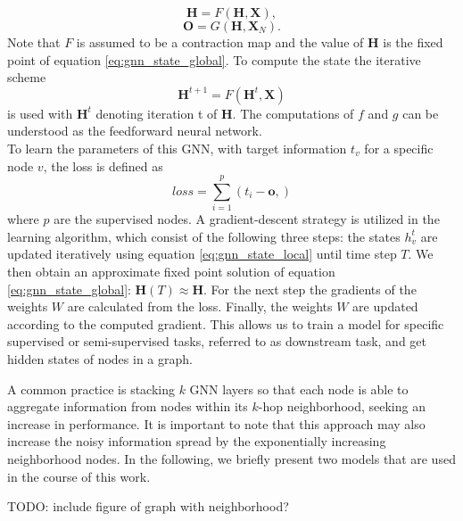 \begin{equation}
    \mathbf{H} = F(\mathbf{H}, \mathbf{X}),
    \label{eq:gnn_state_global}
\end{equation}
\begin{equation}
    \mathbf{O} = G(\mathbf{H},\mathbf{X}_N).
\end{equation}
Note that $F$ is assumed to be a contraction map and the value of $\mathbf{H}$ is the fixed point of equation \eqref{eq:gnn_state_global}. To compute the state the iterative scheme
\begin{equation}
    \label{eq:GNN_iterations}
    \mathbf{H}^{t+1} = F(\mathbf{H}^t, \mathbf{X})
\end{equation}
is used with $\mathbf{H}^t$ denoting iteration t of $\mathbf{H}$. The computations of $f$ and $g$ can be understood as the feedforward neural network. \\
To learn the parameters of this GNN, with target information $t_v$ for a specific node $v$, the loss is defined as
\begin{equation}
    loss = \sum_{i=1}^p (t_i-\mathbf{o},)
\end{equation}
where $p$ are the supervised nodes. A gradient-descent strategy is utilized in the learning algorithm, which consist of the following three steps: the states $h_v^t$ are updated iteratively using equation \eqref{eq:gnn_state_local} until time step $T$. We then obtain an approximate fixed point solution of equation \eqref{eq:gnn_state_global}: $\mathbf{H}(T)\approx\mathbf{H}$. For the next step the gradients of the weights $W$ are calculated from the loss. Finally, the weights $W$ are updated according to the computed gradient. This allows us to train a model for specific supervised or semi-supervised tasks, referred to as downstream task, and get hidden states of nodes in a graph. \bigskip

A common practice is stacking $k$ GNN layers so that each node is able to aggregate information from nodes within its $k$-hop neighborhood, seeking an increase in performance. It is important to note that this approach may also increase the noisy information spread by the exponentially increasing neighborhood nodes\cite{Liu2020}. In the following, we briefly present two models that are used in the course of this work.

TODO: include figure of graph with neighborhood? \bigskip

